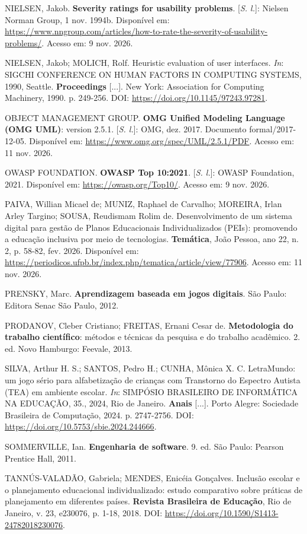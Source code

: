 \begin{referenciasIFTO}
NIELSEN, Jakob. \textbf{Severity ratings for usability problems}. [\textit{S. l.}]: Nielsen Norman Group, 1 nov. 1994b. Disponível em: \url{https://www.nngroup.com/articles/how-to-rate-the-severity-of-usability-problems/}. Acesso em: 9 nov. 2026.

NIELSEN, Jakob; MOLICH, Rolf. Heuristic evaluation of user interfaces. \textit{In}: SIGCHI CONFERENCE ON HUMAN FACTORS IN COMPUTING SYSTEMS, 1990, Seattle. \textbf{Proceedings} [...]. New York: Association for Computing Machinery, 1990. p. 249-256. DOI: \url{https://doi.org/10.1145/97243.97281}.

OBJECT MANAGEMENT GROUP. \textbf{OMG Unified Modeling Language (OMG UML)}: version 2.5.1. [\textit{S. l.}]: OMG, dez. 2017. Documento formal/2017-12-05. Disponível em: \url{https://www.omg.org/spec/UML/2.5.1/PDF}. Acesso em: 11 nov. 2026.

OWASP FOUNDATION. \textbf{OWASP Top 10:2021}. [\textit{S. l.}]: OWASP Foundation, 2021. Disponível em: \url{https://owasp.org/Top10/}. Acesso em: 9 nov. 2026.

PAIVA, Willian Micael de; MUNIZ, Raphael de Carvalho; MOREIRA, Irlan Arley Targino; SOUSA, Reudismam Rolim de. Desenvolvimento de um sistema digital para gestão de Planos Educacionais Individualizados (PEIs): promovendo a educação inclusiva por meio de tecnologias. \textbf{Temática}, João Pessoa, ano 22, n. 2, p. 58-82, fev. 2026. Disponível em: \url{https://periodicos.ufpb.br/index.php/tematica/article/view/77906}. Acesso em: 11 nov. 2026.

PRENSKY, Marc. \textbf{Aprendizagem baseada em jogos digitais}. São Paulo: Editora Senac São Paulo, 2012.

PRODANOV, Cleber Cristiano; FREITAS, Ernani Cesar de. \textbf{Metodologia do trabalho científico}: métodos e técnicas da pesquisa e do trabalho acadêmico. 2. ed. Novo Hamburgo: Feevale, 2013.

SILVA, Arthur H. S.; SANTOS, Pedro H.; CUNHA, Mônica X. C. LetraMundo: um jogo sério para alfabetização de crianças com Transtorno do Espectro Autista (TEA) em ambiente escolar. \textit{In}: SIMPÓSIO BRASILEIRO DE INFORMÁTICA NA EDUCAÇÃO, 35., 2024, Rio de Janeiro. \textbf{Anais} [...]. Porto Alegre: Sociedade Brasileira de Computação, 2024. p. 2747-2756. DOI: \url{https://doi.org/10.5753/sbie.2024.244666}.

SOMMERVILLE, Ian. \textbf{Engenharia de software}. 9. ed. São Paulo: Pearson Prentice Hall, 2011.

TANNÚS-VALADÃO, Gabriela; MENDES, Enicéia Gonçalves. Inclusão escolar e o planejamento educacional individualizado: estudo comparativo sobre práticas de planejamento em diferentes países. \textbf{Revista Brasileira de Educação}, Rio de Janeiro, v. 23, e230076, p. 1-18, 2018. DOI: \url{https://doi.org/10.1590/S1413-24782018230076}.


\end{referenciasIFTO}
